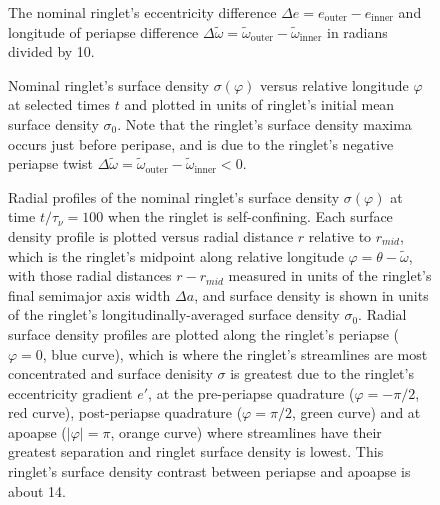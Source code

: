 \documentclass[preprint]{aastex62}
\begin{document}
\begin{figure}
    \caption{
        \label{fig:de_nominal}
        The nominal ringlet's eccentricity difference $\Delta e = e_{\text{outer}} - e_{\text{inner}}$
        and longitude of periapse difference
        $\Delta\tilde{\omega} = \tilde{\omega}_{\text{outer}} - \tilde{\omega}_{\text{inner}}$
        in radians divided by 10.
    }
\end{figure}

\begin{figure}
    \caption{
        \label{fig:nominal_sigma_vs_longitude}
        Nominal ringlet's surface density $\sigma(\varphi)$ versus relative
        longitude $\varphi$ at selected times $t$ and plotted in units of ringlet's initial
        mean surface density $\sigma_0$. Note that the ringlet's surface
        density maxima occurs just before peripase,  and is due to the ringlet's
        negative periapse twist 
        $\Delta\tilde{\omega} = \tilde{\omega}_{\text{outer}} - \tilde{\omega}_{\text{inner}} < 0$.
    }
\end{figure}

\begin{figure}
    \caption{
        \label{fig:radial_sigma_nominal}
        Radial profiles of the nominal ringlet's surface density $\sigma(\varphi)$ at time $t/\tau_\nu=100$
        when the ringlet is self-confining. Each surface density profile is plotted versus radial distance $r$ 
        relative to $r_{mid}$, which is the ringlet's midpoint along relative longitude $\varphi = \theta-\tilde{\omega}$,
        with those radial distances $r - r_{mid}$ measured in units of the ringlet's final semimajor axis width $\Delta a$,
        and surface density is shown in units of the ringlet's longitudinally-averaged surface density $\sigma_0$.
        Radial surface density profiles are plotted along the ringlet's periapse ($\varphi=0$, blue curve), which is 
        where the ringlet's streamlines are most concentrated and surface denisity $\sigma$ is
        greatest due to the ringlet's eccentricity gradient $e'$, at the pre-periapse
        quadrature ($\varphi=-\pi/2$, red curve), post-periapse
        quadrature ($\varphi=\pi/2$, green curve)
        and at apoapse ($|\varphi|=\pi$, orange curve) where streamlines have their greatest separation
        and ringlet surface density is lowest. This ringlet's surface density contrast between periapse and
        apoapse is about 14.
    }
\end{figure}
\end{document}
